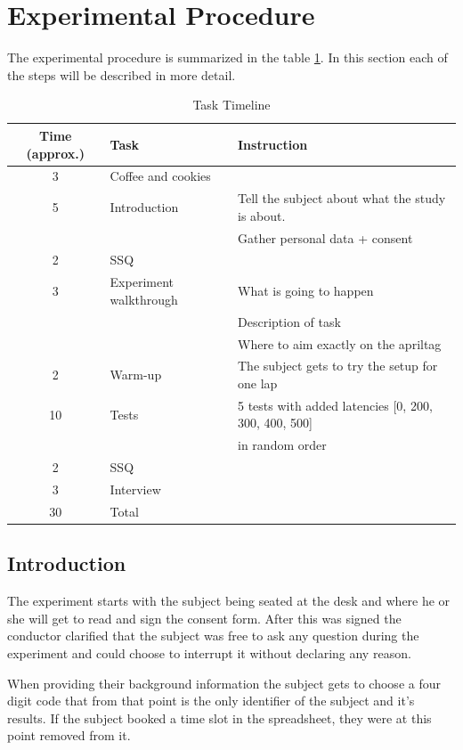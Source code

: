 \documentclass[nofilelist]{cslthse-msc}
\begin{document}
\section{Experimental Procedure}
The experimental procedure is summarized in the table \ref{tab:task-timeline}. In this section each of the steps will be described in more detail. 

\begin{table}[ht]
   \centering
   \caption{Task Timeline}
   \label{tab:task-timeline}
   \begin{tabular}{|c|l|l|}
   \hline
   \textbf{Time (approx.)} & \textbf{Task} & \textbf{Instruction} \\ \hline
   3 & Coffee and cookies & \\ \hline
   5 & Introduction & Tell the subject about what the study is about. \\
   & & Gather personal data + consent \\ \hline
   2 & SSQ & \\ \hline
   3 & Experiment walkthrough & What is going to happen \\
   & & Description of task \\
   & & Where to aim exactly on the apriltag \\ \hline
   2 & Warm-up & The subject gets to try the setup for one lap \\ \hline
   10 & Tests & 5 tests with added latencies [0, 200, 300, 400, 500] \\ 
   & & in random order \\ \hline
   2 & SSQ & \\ \hline
   3 & Interview & \\ \hline
   30 & Total & \\ \hline
   \end{tabular}
\end{table}

\subsection{Introduction}
The experiment starts with the subject being seated at the desk and where he or she will get to read and sign the consent form. After this was signed the conductor clarified that the subject was free to ask any question during the experiment and could choose to interrupt it without declaring any reason. 

When providing their background information the subject gets to choose a four digit code that from that point is the only identifier of the subject and it's results. If the subject booked a time slot in the spreadsheet, they were at this point removed from it.
\end{document}
